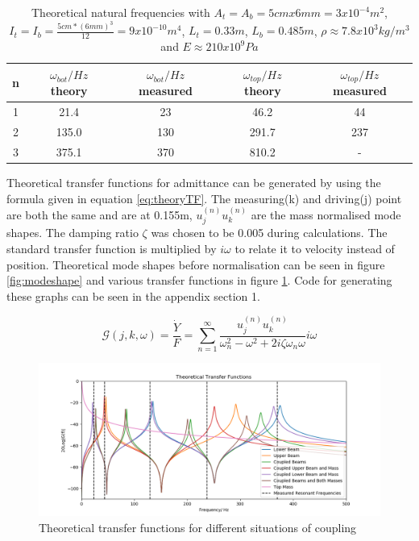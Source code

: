 \documentclass[twoside,onecolumn]{article}
\begin{document}
\begin{table}[h]
\caption{Theoretical natural frequencies with $A_t=A_b=5cmx6mm=3x10^{-4}m^2$, $I_t=I_b=\frac{5cm*(6mm)^3}{12}=9x10^{-10}m^4$, $L_t=0.33m$, $L_b=0.485m$, $\rho \approx 7.8x10^3kg/m^3$ and $E \approx 210x10^9Pa$}
\centering
\begin{tabular}{ c | c | c | c | c }
n & $\omega_{bot}/Hz$ theory & $\omega_{bot}/Hz$ measured &$\omega_{top}/Hz$ theory & $\omega_{top}/Hz$ measured \\

\midrule
1 & 21.4 & 23 & 46.2 & 44 \\
2 & 135.0 & 130 & 291.7 & 237\\
3 & 375.1 & 370 & 810.2 & - \\
\end{tabular}
\label{table:theoryw}
\end{table}

Theoretical transfer functions for admittance can be generated by using the formula given in equation \ref{eq:theoryTF}. The measuring(k) and driving(j) point are both the same and are at 0.155m, $u_j^{(n)}u_k^{(n)}$ are the mass normalised mode shapes. The damping ratio $\zeta$ was chosen to be 0.005 during calculations. The standard transfer function is multiplied by $i\omega$ to relate it to velocity instead of position. Theoretical mode shapes before normalisation can be seen in figure \ref{fig:modeshape} and various transfer functions in figure \ref{fig:TFtheory}. Code for generating these graphs can be seen in the appendix section 1.  

\begin{equation}
\mathcal{G}(j,k,\omega)= \frac {\dot{Y}}{F}=\sum^\infty_{n=1} \frac{u_j^{(n)}u_k^{(n)}}{\omega_n^2-\omega^2 +2i\zeta \omega_n \omega} i\omega
\label{eq:theoryTF}
\end{equation}

\begin{figure}[!htb]
  \centering
    \includegraphics[width=\linewidth]{TFtheory}
  \caption{Theoretical transfer functions for different situations of coupling}
  \label{fig:TFtheory}
\end{figure}
\end{document}

